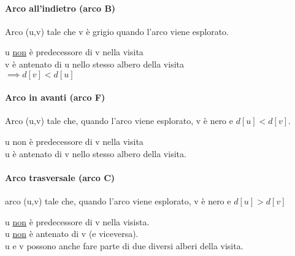 \paragraph*{Arco all'indietro (arco B)} \ra Arco (u,v) tale che v è grigio quando l'arco
viene esplorato.
\begin{center}
\end{center}
u \underline{non} è predecessore di v nella visita\\
v è antenato di u nello stesso albero della visita \\ $\implies d[v] < d[u]$
\paragraph*{Arco in avanti (arco F)} \ra Arco (u,v) tale che, quando l'arco viene esplorato,
v è nero e $d[u] < d[v]$.
\begin{center}
\end{center}
u non è predecessore di v nella visita\\
u è antenato di v nello stesso albero della visita.
\paragraph*{Arco trasversale (arco C)} \ra arco (u,v) tale che, quando l'arco viene esplorato,
v è nero e $d[u] > d[v]$
\begin{center}
\end{center}
u \underline{non} è predecessore di v nella visista.\\
u \underline{non} è antenato di v (e viceversa).\\
u e v possono anche fare parte di due diversi alberi della visita.
